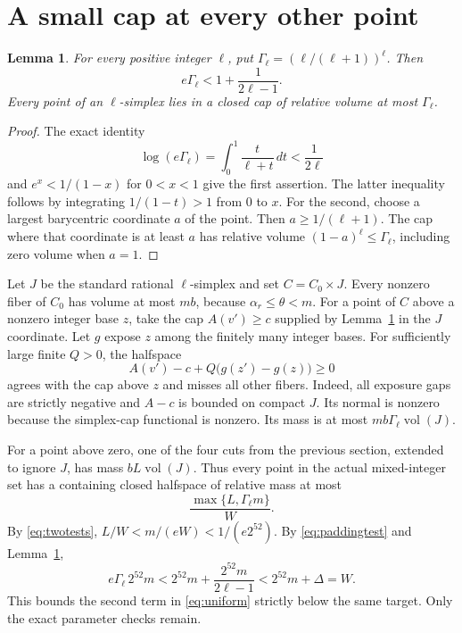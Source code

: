 \documentclass[11pt]{article}
\newtheorem{lemma}{Lemma}
\newcommand{\vol}{\operatorname{vol}}
\begin{document}
\section{A small cap at every other point}\label{sec:caps}
\begin{lemma}\label{lem:padding}
For every positive integer $\ell$, put
$\Gamma_\ell=(\ell/(\ell+1))^\ell$. Then
\[
 e\Gamma_\ell<1+\frac1{2\ell-1}.
\]
Every point of an $\ell$-simplex lies in a closed cap of relative volume
at most $\Gamma_\ell$.
\end{lemma}
\begin{proof}
The exact identity
\[
 \log(e\Gamma_\ell)=\int_0^1\frac{t}{\ell+t}\,dt<\frac1{2\ell}
\]
and $e^x<1/(1-x)$ for $0<x<1$ give the first assertion. The latter
inequality follows by integrating $1/(1-t)>1$ from $0$ to $x$.
For the second, choose a largest barycentric coordinate $a$ of the point.
Then $a\ge1/(\ell+1)$. The cap where that coordinate is at least $a$
has relative volume $(1-a)^\ell\le\Gamma_\ell$, including zero volume
when $a=1$.
\end{proof}

Let $J$ be the standard rational $\ell$-simplex and set $C=C_0\times J$.
Every nonzero fiber of $C_0$ has volume at most $mb$, because
$\alpha_r\le\theta<m$. For a point of $C$ above a nonzero integer base
$z$, take the cap $A(v')\ge c$ supplied by Lemma~\ref{lem:padding} in
the $J$ coordinate. Let $g$ expose $z$ among the finitely many integer
bases. For sufficiently large finite $Q>0$, the halfspace
\[
 A(v')-c+Q\bigl(g(z')-g(z)\bigr)\ge0
\]
agrees with the cap above $z$ and misses all other fibers. Indeed, all
exposure gaps are strictly negative and $A-c$ is bounded on compact $J$.
Its normal is nonzero because the simplex-cap functional is nonzero.
Its mass is at most $mb\Gamma_\ell\vol(J)$.

For a point above zero, one of the four cuts from the previous section,
extended to ignore $J$, has mass $bL\vol(J)$. Thus every point in the
actual mixed-integer set has a containing closed halfspace of relative
mass at most
\begin{equation}\label{eq:uniform}
 \frac{\max\{L,\Gamma_\ell m\}}{W}.
\end{equation}
By \eqref{eq:twotests}, $L/W<m/(eW)<1/(e2^{52})$.
By \eqref{eq:paddingtest} and Lemma~\ref{lem:padding},
\[
 e\Gamma_\ell\,2^{52}m
 <2^{52}m+\frac{2^{52}m}{2\ell-1}
 <2^{52}m+\Delta=W.
\]
This bounds the second term in \eqref{eq:uniform} strictly below the same
target. Only the exact parameter checks remain.
\end{document}
